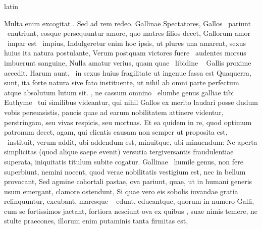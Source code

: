 \documentclass[12pt]{book}
\renewenvironment{latin}
    	{\begin{hyphenrules}{latin}}
    	{\end{hyphenrules}}
\begin{document}
\begin{pages}
\begin{latin}
\begin{Leftside}
                    Multa enim excogitat . 
                    Sed ad rem redeo. 
                    Gallinae Spectatores, Gallos  \ampersand\ pariunt  \ampersand\ enutriunt, eosque persequuntur amore, quo matres filios decet, Gallorum amor  \ampersand\ impar est  \ampersand\ impius, Indulgeretur enim hoc ipsis, ut plures una amarent, sexus huius ita natura postulante, 
                    Verum postquam victores fuere  \ampersand\ audentes morsus imbuerunt sanguine, Nulla amatur verius, quam quae  \ampersand\ libidine  \ampersand\  Gallis proxime accedit. 
                    Harum aunt,  \ampersand\ in sexus huius fragilitate ut ingenue fassa est Quaquerra,  sunt, ita forte natura sive fato instituente, ut nihil ab omni parte perfectum atque absolutum  lutum sit. 
                    , ne cassum omnino  \ampersand\ elumbe genus galliae tibi Euthyme  \ampersand\ tui similibus videantur, 
                    qui nihil  Gallos ex merito laudari posse dudum vobis persuasistis, paucis quae ad earum nobilitatem attinere videntur, perstringam, seu vivas respicis, seu mortuas. 
                    Et ea quidem in re, quod optimum patronum decet, agam, 
                    qui clientis causam non semper ut proposita est,   \ampersand\ instituit, 
                    verum addit, ubi addendum est, minuitque, ubi minuendum: 
                    Ne aperta simplicitas (quod alique saepe evenit) versutia tergiversantis fraudulentiae superata, iniquitatis titulum subite cogatur. 
                    Gallinae   \ampersand\ humile genus, non fere superbiunt, nemini nocent, quod verae nobilitatis vestigium est, nec in bellum  provocant, 
                    Sed agmine cohortali pastae, ova pariunt, quae, ut in humani generis usum emergant, clamore ostendunt, 
                    Si quae vero eis sobolis iuvandae gratia relinquuntur, excubant, maresque  \ampersand\  edunt, educantque, 
                    quorum in numero Galli, cum se fortissimos jactant, 
                    fortiora nesciunt  ova ex quibus , suae nimis temere, 
                    ne stulte  praecones, illorum enim putaminis tanta firmitas est, 

\end{Leftside}
\end{latin}
\end{pages}
\end{document}

